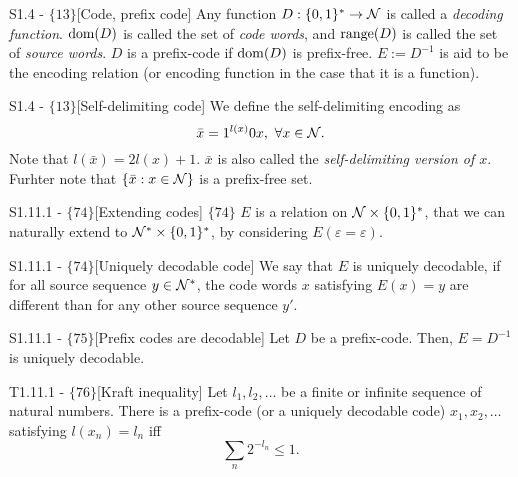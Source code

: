 \documentclass{article}
\begin{document}
\begin{flexidefinition}{S1.4 - $\{13\}$}[Code, prefix code] Any function $D : \{0,1\}^\ast \to \mathcal{N}$ is called a \textit{decoding function}. $\operatorname{dom}(D)$ is called the set of \textit{code words}, and $\operatorname{range}(D)$ is called the set of \textit{source words}. $D$ is a prefix-code if $\operatorname{dom}(D)$ is prefix-free. $E := D^{-1}$ is aid to be the encoding relation (or encoding function in the case that it is a function).
\end{flexidefinition}

\begin{flexidefinition}{S1.4 - $\{13\}$}[Self-delimiting code]
    We define the self-delimiting encoding as
    \begin{equation}
        \bar x = 1^{l(x)}0x, \ \forall x \in \mathcal{N}.
    \end{equation}
    Note that $l(\bar x) = 2 l(x) + 1$. $\bar x$ is also called the \textit{self-delimiting version of $x$}. Furhter note that $\{\bar x : x \in \mathcal{N}\}$ is a prefix-free set.
\end{flexidefinition}

\begin{flexidefinition}{S1.11.1 - $\{74\}$}[Extending codes]
$\{74\}$ $E$ is a relation on $\mathcal{N} \times \{0,1\}^\ast$, that we can naturally extend to $\mathcal{N}^\ast \times \{0,1\}^\ast$, by considering $E(\varepsilon = \varepsilon)$.
\end{flexidefinition}

\begin{flexidefinition}{S1.11.1 - $\{74\}$}[Uniquely decodable code]
    We say that $E$ is uniquely decodable, if for all source sequence $y \in \mathcal{N}^\ast$, the code words $x$ satisfying $E(x) = y$ are different than for any other source sequence $y'$.
\end{flexidefinition}

\begin{flexilemma}{S1.11.1 - $\{75\}$}[Prefix codes are decodable]
    Let $D$ be a prefix-code. Then, $E = D^{-1}$ is uniquely decodable.
\end{flexilemma}

\begin{flexitheorem}{T1.11.1 - $\{76\}$}[Kraft inequality]
    Let $l_1,l_2,\ldots$ be a finite or infinite sequence of natural numbers. There is a prefix-code (or a uniquely decodable code) $x_1,x_2,\ldots$ satisfying $l(x_n) = l_n$ iff 
    \begin{equation}
        \sum_{n} 2^{-l_n} \leq 1.
    \end{equation}
\end{flexitheorem}
\end{document}
